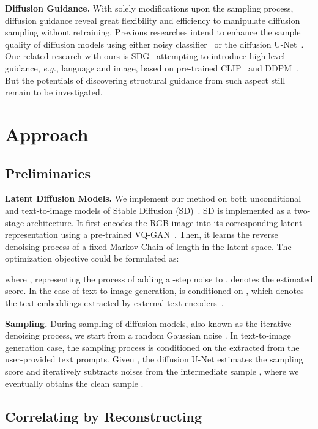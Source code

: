 \documentclass{article}
\begin{document}
\textbf{Diffusion Guidance.} With solely modifications upon the sampling process, diffusion guidance reveal great flexibility and efficiency to manipulate diffusion sampling without retraining. Previous researches intend to enhance the sample quality of diffusion models using either noisy classifier~\cite{dhariwal2021diffusion} or the diffusion U-Net~\cite{ho2022classifier}. One related research with ours is SDG~\cite{liu2023more} attempting to introduce high-level guidance, \textit{e.g.}, language and image, based on pre-trained CLIP~\cite{radford2021learning} and DDPM~\cite{nichol2021improved}. But the potentials of discovering structural guidance from such aspect still remain to be investigated.

\section{Approach}
\label{section:approach}

\subsection{Preliminaries}

\textbf{Latent Diffusion Models.} We implement our method on both unconditional and text-to-image models of Stable Diffusion (SD)~\cite{rombach2022high}. SD is implemented as a two-stage architecture. It first encodes the RGB image  into its corresponding latent representation  using a pre-trained VQ-GAN~\cite{esser2021taming}. Then, it learns the reverse denoising process of a fixed Markov Chain of length  in the latent space. The optimization objective could be formulated as:

where , representing the process of adding a -step noise to .  denotes the estimated score. In the case of text-to-image generation,  is conditioned on , which denotes the text embeddings extracted by external text encoders~\cite{radford2021learning, cherti2022reproducible}.

\textbf{Sampling.} During sampling of diffusion models, also known as the iterative denoising process, we start from a random Gaussian noise . In text-to-image generation case, the sampling process is conditioned on the  extracted from the user-provided text prompts. Given , the diffusion U-Net estimates the sampling score  and iteratively subtracts noises from the intermediate sample , where we eventually obtains the clean sample .

\subsection{Correlating by Reconstructing}
\label{section:condition adapter}
\end{document}
